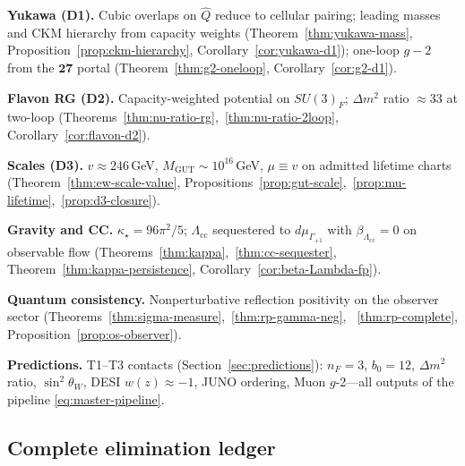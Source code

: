 \medskip
\noindent\textbf{Yukawa (D1).}
Cubic overlaps on $\hat Q$ reduce to cellular pairing; leading masses and CKM
hierarchy from capacity weights (Theorem~\ref{thm:yukawa-mass},
Proposition~\ref{prop:ckm-hierarchy}, Corollary~\ref{cor:yukawa-d1});
one-loop $g-2$ from the $\mathbf{27}$ portal (Theorem~\ref{thm:g2-oneloop},
Corollary~\ref{cor:g2-d1}).

\medskip
\noindent\textbf{Flavon RG (D2).}
Capacity-weighted potential on $SU(3)_F$; $\Delta m^2$ ratio $\approx 33$ at
two-loop (Theorems~\ref{thm:nu-ratio-rg},~\ref{thm:nu-ratio-2loop},
Corollary~\ref{cor:flavon-d2}).

\medskip
\noindent\textbf{Scales (D3).}
$v\approx 246$\,GeV, $M_{\mathrm{GUT}}\sim 10^{16}$\,GeV, $\mu\equiv v$ on
admitted lifetime charts (Theorem~\ref{thm:ew-scale-value},
Propositions~\ref{prop:gut-scale},~\ref{prop:mu-lifetime},~\ref{prop:d3-closure}).

\medskip
\noindent\textbf{Gravity and CC.}
$\kappa_\star=96\pi^2/5$; $\Lambda_{\mathrm{cc}}$ sequestered to
$d\mu_{\Gamma_{+1}}$ with $\beta_{\Lambda_{\mathrm{cc}}}=0$ on observable flow
(Theorems~\ref{thm:kappa},~\ref{thm:cc-sequester},
Theorem~\ref{thm:kappa-persistence},
Corollary~\ref{cor:beta-Lambda-fp}).

\medskip
\noindent\textbf{Quantum consistency.}
Nonperturbative reflection positivity on the observer sector
(Theorems~\ref{thm:sigma-measure},~\ref{thm:rp-gamma-neg},
~\ref{thm:rp-complete}, Proposition~\ref{prop:os-observer}).

\medskip
\noindent\textbf{Predictions.}
T1--T3 contacts (Section~\ref{sec:predictions}): $n_F=3$, $b_0=12$,
$\Delta m^2$ ratio, $\sin^2\theta_W$, DESI $w(z)\approx -1$, JUNO ordering,
Muon $g$-2---all outputs of the pipeline \eqref{eq:master-pipeline}.

\subsection{Complete elimination ledger}

